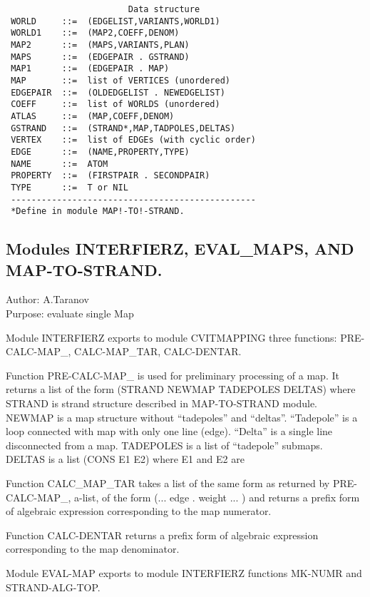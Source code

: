 \begin{verbatim}
                        Data structure
 WORLD     ::=  (EDGELIST,VARIANTS,WORLD1)
 WORLD1    ::=  (MAP2,COEFF,DENOM)
 MAP2      ::=  (MAPS,VARIANTS,PLAN)
 MAPS      ::=  (EDGEPAIR . GSTRAND)
 MAP1      ::=  (EDGEPAIR . MAP)
 MAP       ::=  list of VERTICES (unordered)
 EDGEPAIR  ::=  (OLDEDGELIST . NEWEDGELIST)
 COEFF     ::=  list of WORLDS (unordered)
 ATLAS     ::=  (MAP,COEFF,DENOM)
 GSTRAND   ::=  (STRAND*,MAP,TADPOLES,DELTAS)
 VERTEX    ::=  list of EDGEs (with cyclic order)
 EDGE      ::=  (NAME,PROPERTY,TYPE)
 NAME      ::=  ATOM
 PROPERTY  ::=  (FIRSTPAIR . SECONDPAIR)
 TYPE      ::=  T or NIL
 ------------------------------------------------
 *Define in module MAP!-TO!-STRAND.

\end{verbatim}

\subsection*{Modules INTERFIERZ, EVAL\_MAPS, AND MAP-TO-STRAND.}

\begin{center}
Author: A.Taranov \\
Purpose: evaluate single Map
\end{center}

Module INTERFIERZ exports to module CVITMAPPING three functions:
PRE-CALC-MAP\_, CALC-MAP\_TAR, CALC-DENTAR.

Function PRE-CALC-MAP\_ is used for preliminary processing of a map. It
returns a list of the form (STRAND NEWMAP TADEPOLES DELTAS) where
STRAND is strand structure described in MAP-TO-STRAND module.  NEWMAP
is a map structure without ``tadepoles'' and ``deltas''.  ``Tadepole'' is a
loop connected with map with only one line (edge). ``Delta'' is a single
line disconnected from a map.  TADEPOLES is a list of ``tadepole''
submaps.  DELTAS is a list (CONS E1 E2) where E1 and E2 are

Function CALC\_MAP\_TAR takes a list of the same form as returned by
PRE-CALC-MAP\_, a-list, of the form (...  edge . weight ...  )  and
returns a prefix form of algebraic expression corresponding to the map
numerator.

Function CALC-DENTAR returns a prefix form of algebraic expression
corresponding to the map denominator.

Module EVAL-MAP exports to module INTERFIERZ functions MK-NUMR and
STRAND-ALG-TOP.

